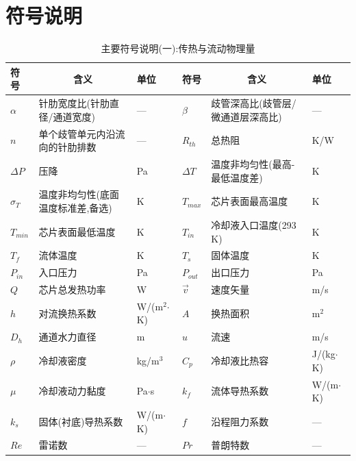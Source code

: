 %
\section{符号说明}

\begin{table}[H]
\centering
\small
\setlength{\tabcolsep}{2.5pt}
\caption{主要符号说明(一):传热与流动物理量}
\begin{tabular}{>{\centering\arraybackslash}p{1.4cm}p{4.6cm}>{\centering\arraybackslash}p{1.2cm}>{\centering\arraybackslash}p{1.4cm}p{4.6cm}>{\centering\arraybackslash}p{1.2cm}}
\toprule
符号 & \multicolumn{1}{c}{含义} & 单位 & 符号 & \multicolumn{1}{c}{含义} & 单位 \\
\midrule
$\alpha$   & 针肋宽度比(针肋直径/通道宽度) & — & $\beta$    & 歧管深高比(歧管层/微通道层深高比) & — \\
$n$        & 单个歧管单元内沿流向的针肋排数 & — & $R_{th}$   & 总热阻 & K/W \\
$\Delta P$ & 压降 & Pa & $\Delta T$ & 温度非均匀性(最高-最低温度差) & K \\
$\sigma_T$ & 温度非均匀性(底面温度标准差,备选) & K & $T_{max}$  & 芯片表面最高温度 & K \\
$T_{min}$  & 芯片表面最低温度 & K & $T_{in}$   & 冷却液入口温度(293 K) & K \\
$T_f$      & 流体温度 & K & $T_s$      & 固体温度 & K \\
$P_{in}$   & 入口压力 & Pa & $P_{out}$  & 出口压力 & Pa \\
$Q$        & 芯片总发热功率 & W & $\vec{v}$  & 速度矢量 & m/s \\
$h$        & 对流换热系数 & W/(m$^2$$\cdot$K) & $A$ & 换热面积 & m$^2$ \\
$D_h$      & 通道水力直径 & m & $u$        & 流速 & m/s \\
$\rho$     & 冷却液密度 & kg/m$^3$ & $C_p$      & 冷却液比热容 & J/(kg$\cdot$K) \\
$\mu$      & 冷却液动力黏度 & Pa$\cdot$s & $k_f$      & 流体导热系数 & W/(m$\cdot$K) \\
$k_s$      & 固体(衬底)导热系数 & W/(m$\cdot$K) & $f$        & 沿程阻力系数 & — \\
$Re$       & 雷诺数 & — & $Pr$       & 普朗特数 & — \\
\bottomrule
\end{tabular}
\end{table}


